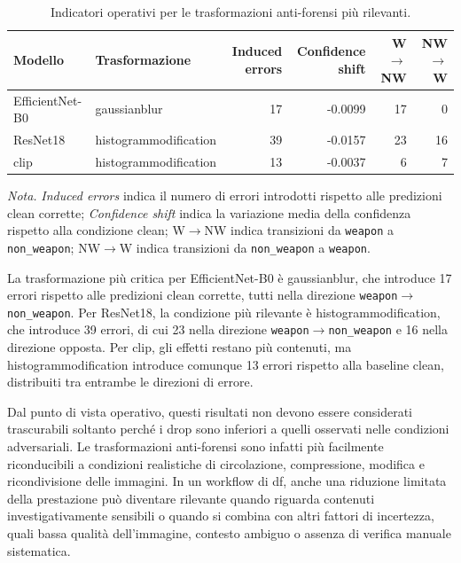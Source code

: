 \begin{table}[H]
\centering
\scriptsize
\setlength{\tabcolsep}{4pt}
\renewcommand{\arraystretch}{1.15}
\caption{Indicatori operativi per le trasformazioni anti-forensi più rilevanti.}
\label{tab:results-antiforensic-operational-errors}
\begin{tabular}{@{}l l r r r r@{}}
\toprule
\textbf{Modello} &
\textbf{Trasformazione} &
\textbf{Induced errors} &
\textbf{Confidence shift} &
\textbf{W\(\rightarrow\)NW} &
\textbf{NW\(\rightarrow\)W} \\
\midrule
EfficientNet-B0 & \gls{gaussianblur} & 17 & -0.0099 & 17 & 0 \\
ResNet18 & \gls{histogrammodification} & 39 & -0.0157 & 23 & 16 \\
\acrshort{clip} & \gls{histogrammodification} & 13 & -0.0037 & 6 & 7 \\
\bottomrule
\end{tabular}

\vspace{0.4em}
\footnotesize
\textit{Nota.} \textit{Induced errors} indica il numero di errori introdotti
rispetto alle predizioni clean corrette; \textit{Confidence shift} indica la
variazione media della confidenza rispetto alla condizione clean;
W\(\rightarrow\)NW indica transizioni da \texttt{weapon} a
\texttt{non\_weapon}; NW\(\rightarrow\)W indica transizioni da
\texttt{non\_weapon} a \texttt{weapon}.
\end{table}

La trasformazione più critica per EfficientNet-B0 è \gls{gaussianblur}, che
introduce 17 errori rispetto alle predizioni clean corrette, tutti nella direzione
\texttt{weapon}\(\rightarrow\)\texttt{non\_weapon}. Per ResNet18, la condizione
più rilevante è \gls{histogrammodification}, che introduce 39 errori, di cui 23
nella direzione \texttt{weapon}\(\rightarrow\)\texttt{non\_weapon} e 16 nella
direzione opposta. Per \gls{clip}, gli effetti restano più contenuti, ma
\gls{histogrammodification} introduce comunque 13 errori rispetto alla baseline
clean, distribuiti tra entrambe le direzioni di errore.

Dal punto di vista operativo, questi risultati non devono essere considerati
trascurabili soltanto perché i drop sono inferiori a quelli osservati nelle
condizioni adversariali. Le trasformazioni anti-forensi sono infatti più
facilmente riconducibili a condizioni realistiche di circolazione, compressione,
modifica e ricondivisione delle immagini. In un workflow di \gls{df}, anche una
riduzione limitata della prestazione può diventare rilevante quando riguarda
contenuti investigativamente sensibili o quando si combina con altri fattori di
incertezza, quali bassa qualità dell'immagine, contesto ambiguo o assenza di
verifica manuale sistematica.




